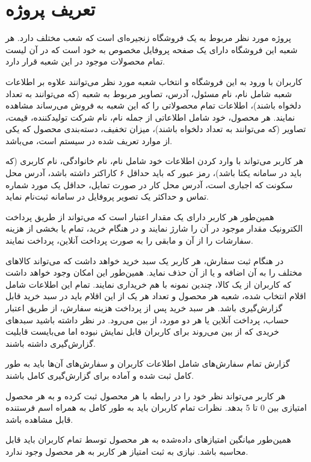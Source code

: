 \documentclass[12pt,a4paper]{article}
\begin{document}
\section{تعریف پروژه}
پروژه مورد نظر مربوط به یک فروشگاه زنجیره‌ای است که شعب مختلف دارد.
هر شعبه این فروشگاه دارای یک صفحه پروفایل مخصوص به خود است که در آن لیست تمام محصولات موجود در این شعبه قرار دارد. 
\par
کاربران با ورود به این فروشگاه و انتخاب شعبه مورد نظر می‌توانند
علاوه بر اطلاعات شعبه شامل نام، نام مسئول، آدرس، تصاویر مربوط به شعبه (که می‌توانند به تعداد دلخواه باشند)،
اطلاعات تمام محصولاتی را که این شعبه به فروش می‌رساند مشاهده نمایند.
هر محصول، خود شامل اطلاعاتی از جمله نام، نام شرکت تولیدکننده، قیمت، تصاویر (که می‌توانند به تعداد دلخواه باشند)،
میزان تخفیف، دسته‌بندی محصول که یکی از موارد تعریف شده در سیستم است، می‌باشد.
\par
هر کاربر می‌تواند با وارد کردن اطلاعات خود شامل نام،‌ نام خانوادگی، نام کاربری (که باید در سامانه یکتا باشد)،
رمز عبور که باید حداقل ۶ کاراکتر داشته باشد، آدرس محل سکونت که اجباری است،
آدرس محل کار در صورت تمایل، حداقل یک مورد شماره تماس و حداکثر یک تصویر پروفایل در سامانه ثبت‌نام نماید. 
\par
همین‌طور هر کاربر دارای یک مقدار اعتبار است که می‌تواند از طریق پرداخت الکترونیک مقدار موجود در آن را شارژ نمایند
و در هنگام خرید، تمام یا بخشی از هزینه سفارشات را از آن و مابقی را به صورت پرداخت آنلاین، پرداخت نمایند.
\par
در هنگام ثبت سفارش، هر کاربر یک سبد خرید خواهد داشت که می‌تواند کالاهای مختلف را به آن اضافه و یا از آن حذف نماید.
همین‌طور این امکان وجود خواهد داشت که کاربران از یک کالا، چندین نمونه با هم خریداری نمایند.
تمام این اطلاعات شامل اقلام انتخاب شده، شعبه هر محصول و تعداد هر یک از این اقلام باید در سبد خرید قابل گزارش‌گیری باشد.
هر سبد خرید پس از پرداخت هزینه سفارش، از طریق اعتبار حساب، پرداخت آنلاین یا هر دو مورد، از بین می‌رود.
در نظر داشته باشید سبد‌های خریدی که از بین می‌روند برای کاربران قابل نمایش نبوده اما می‌بایست قابلیت گزارش‌گیری داشته باشند.
\par
گزارش تمام سفارش‌های شامل اطلاعات کاربران و سفارش‌های آن‌ها باید به طور کامل ثبت شده و آماده برای گزارش‌گیری کامل باشند.
\par
هر کاربر می‌تواند نظر خود را در رابطه با هر محصول ثبت کرده و به هر محصول امتیازی بین 0 تا 5 بدهد. نظرات تمام کاربران باید به طور کامل به همراه اسم فرستنده قابل مشاهده باشد.
\par
همین‌طور میانگین امتیازهای داده‌شده به هر محصول توسط تمام کاربران باید قابل محاسبه باشد. نیازی به ثبت امتیاز هر کاربر به هر محصول وجود ندارد.
\end{document}
